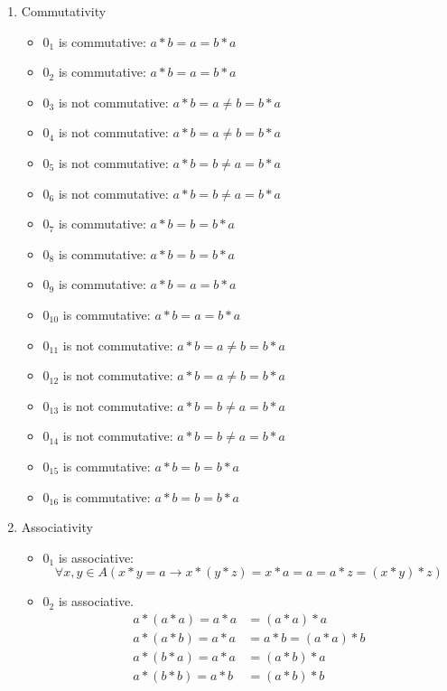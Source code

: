 \begin{enumerate}[label={\Alph*.},font={\bfseries}]
\begin{enumerate}[label={\arabic*},font={\bfseries}]
\begin{minipage}[h]{.25\textwidth}
\begin{tabular}{ r | l }
          \end{tabular}
        \end{minipage}
      \item Commutativity
        \begin{itemize}
          \item $0_1$ is commutative: $a*b=a=b*a$
          \item $0_2$ is commutative: $a*b=a=b*a$
          \item $0_3$ is not commutative: $a*b=a \neq b=b*a$
          \item $0_4$ is not commutative: $a*b=a \neq b=b*a$
          \item $0_5$ is not commutative: $a*b=b \neq a=b*a$
          \item $0_6$ is not commutative: $a*b=b \neq a=b*a$
          \item $0_7$ is commutative: $a*b=b=b*a$
          \item $0_8$ is commutative: $a*b=b=b*a$
          \item $0_9$ is commutative: $a*b=a=b*a$
          \item $0_{10}$ is commutative: $a*b=a=b*a$
          \item $0_{11}$ is not commutative: $a*b=a \neq b=b*a$
          \item $0_{12}$ is not commutative: $a*b=a \neq b=b*a$
          \item $0_{13}$ is not commutative: $a*b=b \neq a=b*a$
          \item $0_{14}$ is not commutative: $a*b=b \neq a=b*a$
          \item $0_{15}$ is commutative: $a*b=b=b*a$
          \item $0_{16}$ is commutative: $a*b=b=b*a$
        \end{itemize}
      \item Associativity
        \begin{itemize}
          \item $0_1$ is associative:
            $$\forall x,y \in A (x*y=a \to x*(y*z)=x*a=a=a*z=(x*y)*z)$$
          \item $0_2$ is associative.
            \begin{align*}
              a*(a*a) = a*a &= (a*a)*a \\
              a*(a*b) = a*a &= a*b = (a*a)*b \\
              a*(b*a) = a*a &= (a*b)*a \\
              a*(b*b) = a*b &= (a*b)*b \\

\end{align*}
\end{itemize}
\end{enumerate}
\end{enumerate}
